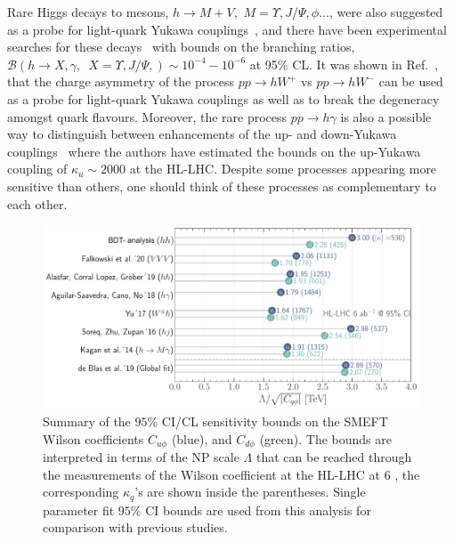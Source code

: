 Rare Higgs decays to mesons, $h \to M +V ,\, \, M = \Upsilon, J/\Psi, \phi\dots$, were also suggested as a probe for light-quark Yukawa couplings~\cite{Bodwin:2013gca,Kagan:2014ila,Konig:2015qat}, and there have been experimental searches for these decays~\cite{ATLAS-CONF-2021-021,CMS:2018gcm} with bounds on the branching ratios, $\mathcal{B} (h \to X, \gamma, \,\,\, X =\Upsilon, J/\Psi,  ) \sim 10^{-4} - 10^{-6}$ at 95\% CL. It was shown in Ref.~\cite{Yu:2017vul}, that the charge asymmetry of the process $pp \to h W^+$ vs $ pp \to h W^-$ can be used as a probe for light-quark Yukawa couplings as well as to break the degeneracy amongst quark flavours. Moreover, the rare process $ pp \to h \gamma$ is also a possible way to distinguish between enhancements of the up- and down-Yukawa couplings~\cite{Aguilar-Saavedra:2020rgo} where the authors have estimated the bounds on the up-Yukawa coupling of $\kappa_u\sim 2000$ at the HL-LHC. Despite some processes appearing more sensitive than others, one should think of these processes as complementary to each other. 

\begin{figure}[t!]
	\includegraphics[width=\linewidth]{figures/ueberblick_ly.pdf}
	\caption{Summary of the $95\%$ CI/CL sensitivity bounds on the SMEFT Wilson coefficients $C_{u\phi}$ (blue), and $C_{d\phi}$ (green). The bounds are interpreted in terms of the NP scale $\Lambda$ that can be reached through the measurements of the Wilson coefficient at the HL-LHC at $6$ \invab, the corresponding $\kappa_q$'s are shown inside the parentheses. Single parameter fit $95\%$ CI bounds are used from this analysis for comparison with previous studies.}
	\label{fig:comparison}
\end{figure}

